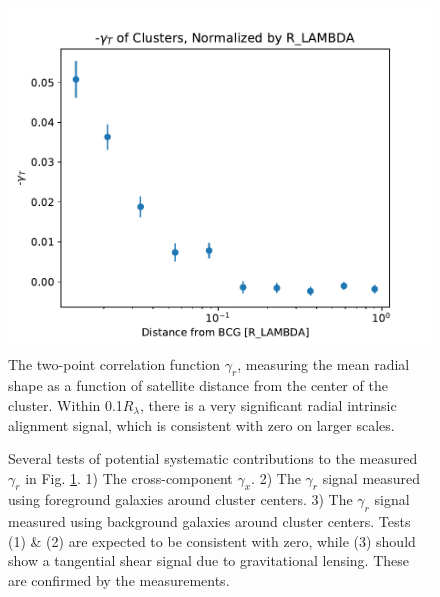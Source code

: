 \documentclass[fleqn,usenatbib]{mnras}
\begin{document}


\begin{figure}
\begin{center}
\includegraphics[width=\columnwidth]{gamma_T_rel.pdf}
\end{center}
\caption[]{The two-point correlation function $\gamma_r$, measuring the mean radial shape as a function of satellite distance from the center of the cluster. Within 0.1$R_\lambda$, there is a very significant radial intrinsic alignment signal, which is consistent with zero on larger scales.
\label{fig:gammar}}
\end{figure}


\begin{figure}
\begin{center}
\end{center}
\caption[]{Several tests of potential systematic contributions to the measured $\gamma_r$ in Fig. \ref{fig:gammar}. 1) The cross-component $\gamma_x$. 2) The $\gamma_r$ signal measured using foreground galaxies around cluster centers. 3) The $\gamma_r$ signal measured using background galaxies around cluster centers. Tests (1) \& (2) are expected to be consistent with zero, while (3) should show a tangential shear signal due to gravitational lensing. These are confirmed by the measurements.
\label{fig:gammax}}
\end{figure}
\end{document}

